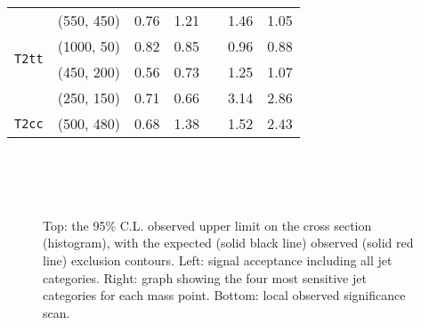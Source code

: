 \begin{table*}[!t]
\begin{tabular}{ llccccc }
                                            & (550, 450)    & 0.76 & 1.21 &  & 1.46 & 1.05 \\ [0.5ex]
    \multirow{2}{*}{\texttt{T2tt}}          & (1000, 50)    & 0.82 & 0.85 &  & 0.96 & 0.88 \\
                                            & (450, 200)    & 0.56 & 0.73 &  & 1.25 & 1.07 \\ 
                                            & (250, 150)    & 0.71 & 0.66 &  & 3.14 & 2.86 \\ [0.5ex]
    \multirow{1}{*}{\texttt{T2cc}}          & (500, 480)    & 0.68 & 1.38 &  & 1.52 & 2.43 \\ [0.5ex]
    \hline
  \end{tabular}
\end{table*}


\newpage
\begin{figure}[h!]
    \begin{center}
         \\
         ~~
         \\
         ~~
        \caption{Top: the 95\% C.L. observed upper limit on the cross section
            (histogram), with the expected (solid black line) observed
            (solid red line) exclusion contours. Left: signal acceptance
            including all jet categories. Right: graph showing the four
            most sensitive jet categories for each mass point. Bottom:
            local observed significance scan.
        }
        \label{fig:T1qqqq}
    \end{center}
\end{figure}

